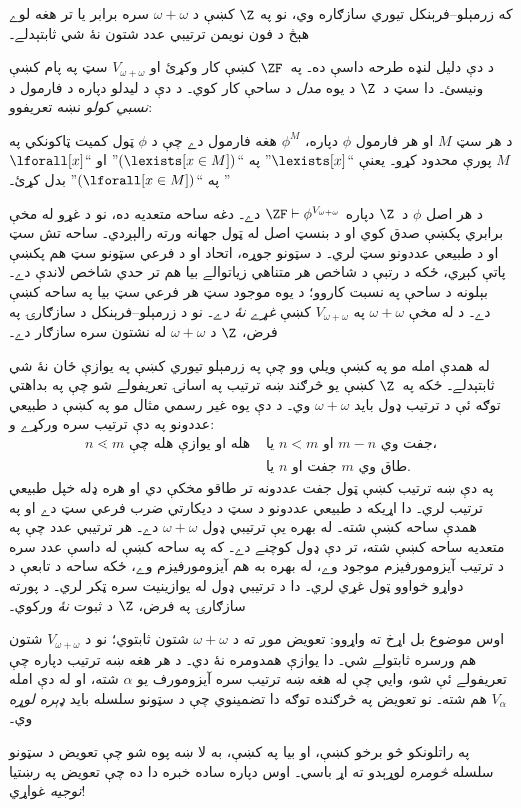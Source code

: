 \documentclass[../../../include/open-logic-section]{subfiles}
\begin{document}

که زرمېلو–فرېنکل تيوري سازګاره وي، نو په $\Z$ کښې د
$\omega + \omega$ سره برابر يا تر هغه لوے هېڅ د فون نويمن
ترتيبي عدد شتون نۀ شي ثابتېدلے۔

د دې دليل لنډه طرحه داسې ده۔ په~$\ZF$ کښې کار وکړئ او
$V_{\omega+\omega}$ سټ په پام کښې ونيسئ۔ دا سټ د~$\Z$ د يوه
\emph{مدل} د ساحې کار کوي۔ د دې د ليدلو دپاره د فارمول د
\emph{نسبي کولو} نښه تعريفوو:
\begin{defn}
	د هر سټ $M$ او هر فارمول $\phi$ دپاره، $\phi^M$ هغه فارمول دے
چې د $\phi$ ټول کميت ټاکونکي په $M$ پورې محدود کړو۔ يعنې
``$\lexists[x]$'' په ``$(\lexists[x \in M])$'' او
``$\lforall[x]$'' په ``$(\lforall[x \in M])$'' بدل کړئ۔
\end{defn}\noindent
د هر اصل $\phi$ د~$\Z$ دپاره
$\ZF \vdash \phi^{V_{\omega+\omega}}$ دے۔ دغه ساحه متعديه
ده، نو د غړو له مخې برابري پکښې صدق کوي او د بنسټ اصل له ټول
جهانه ورته رالېږدي۔ ساحه تش سټ او د طبيعي عددونو سټ لري۔
د سټونو جوړه، اتحاد او د فرعي سټونو سټ هم پکښې پاتې کېږي، ځکه
د رتبې د شاخص هر متناهي زياتوالے بيا هم تر حدي شاخص لاندې
دے۔ بېلونه د ساحې په نسبت کاروو؛ د يوه موجود سټ هر فرعي
سټ بيا په ساحه کښې دے۔ د 
له مخې $\omega+\omega$ په $V_{\omega+\omega}$ کښې
\emph{غړے نۀ دے}۔ نو د زرمېلو–فرېنکل د سازګارۍ په فرض،
$\Z$ د $\omega+\omega$ له نشتون سره سازګار دے۔

له همدې امله مو په  کښې ويلي وو
چې  په زرمېلو
تيوري کښې په يوازې ځان نۀ شي ثابتېدلے۔ ځکه په~$\Z$ کښې يو څرګند ښه ترتيب په اسانۍ تعريفولے
شو چې په بداهتي توګه ئې د ترتيب ډول بايد $\omega+\omega$ وي۔ د دې
يوه غير رسمي مثال مو په  کښې د طبيعي
عددونو په دې ترتيب سره ورکړے و:
\begin{align*}
	n \lessdot m \text{ هله او يوازې هله چې }&\text{يا }n < m\text{ او }m-n\text{ جفت وي،}\\
	& \text{يا $n$ جفت او $m$ طاق وي.}
\end{align*}
په دې ښه ترتيب کښې ټول جفت عددونه تر طاقو مخکې دي او
هره ډله خپل طبيعي ترتيب لري۔ دا اړيکه د طبيعي عددونو د سټ د ديکارتي ضرب فرعي سټ دے او په همدې ساحه کښې شته۔ له بهره يې ترتيبي ډول
$\omega+\omega$ دے۔ هر ترتيبي عدد چې په متعديه ساحه کښې
شته، تر دې ډول کوچنے دے۔ که په ساحه کښې له داسې عدد سره
د ترتيب آيزومورفيزم موجود وے، له بهره به هم آيزومورفيزم وے،
ځکه ساحه د تابعې د دواړو خواوو ټول غړي لري۔ دا د ترتيبي
ډول له يوازينيت سره ټکر لري۔ د پورته سازګارۍ په فرض،
$\Z$ د 
ثبوت \emph{نۀ} ورکوي۔

اوس موضوع بل اړخ ته واړوو: تعويض موږ ته د $\omega+\omega$ شتون
ثابتوي؛ نو د $V_{\omega+\omega}$ شتون هم ورسره ثابتولے شي۔ دا يوازې
همدومره نۀ دي۔ د هر هغه ښه ترتيب دپاره چې تعريفولے ئې شو،
 وايي چې له هغه
ښه ترتيب سره آيزومورف يو $\alpha$ شته، او له دې امله $V_\alpha$ هم
شته۔ نو تعويض په څرګنده توګه دا تضمينوي چې د سټونو سلسله بايد
\emph{ډېره لوړه} وي۔

په راتلونکو څو برخو کښې، او بيا په
 کښې، به لا ښه پوه شو چې تعويض د
سټونو سلسله \emph{څومره} لوړېدو ته اړ باسي۔ اوس دپاره ساده خبره دا ده
چې تعويض په رښتيا \emph{توجيه} غواړي!
\end{document}
